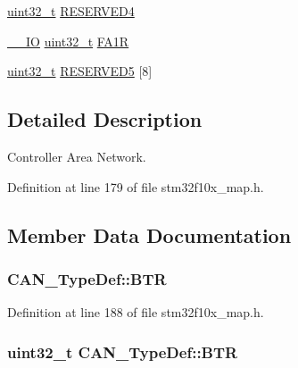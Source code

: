 \begin{DoxyCompactItemize}
\item 
\hyperlink{_p_e___types_8h_a33594304e786b158f3fb30289278f5af}{uint32\+\_\+t} \hyperlink{struct_c_a_n___type_def_a51c408c7c352b8080f0c6d42bf811d43}{R\+E\+S\+E\+R\+V\+E\+D4}
\item 
\hyperlink{group___c_m_s_i_s___c_m3__core__definitions_gaec43007d9998a0a0e01faede4133d6be}{\+\_\+\+\_\+\+IO} \hyperlink{_p_e___types_8h_a33594304e786b158f3fb30289278f5af}{uint32\+\_\+t} \hyperlink{struct_c_a_n___type_def_ab57a3a6c337a8c6c7cb39d0cefc2459a}{F\+A1R}
\item 
\hyperlink{_p_e___types_8h_a33594304e786b158f3fb30289278f5af}{uint32\+\_\+t} \hyperlink{struct_c_a_n___type_def_ad4339975b6064cfe2aaeb642f916d6e0}{R\+E\+S\+E\+R\+V\+E\+D5} \mbox{[}8\mbox{]}
\end{DoxyCompactItemize}


\subsection{Detailed Description}
Controller Area Network. 

Definition at line 179 of file stm32f10x\+\_\+map.\+h.



\subsection{Member Data Documentation}
\subsubsection[{\texorpdfstring{B\+TR}{BTR}}]{ C\+A\+N\+\_\+\+Type\+Def\+::\+B\+TR}\hypertarget{struct_c_a_n___type_def_a62b2f51fd71dee6149a8cf739fd3d284}{}\label{struct_c_a_n___type_def_a62b2f51fd71dee6149a8cf739fd3d284}


Definition at line 188 of file stm32f10x\+\_\+map.\+h.

\subsubsection[{\texorpdfstring{B\+TR}{BTR}}]{ {\bf uint32\+\_\+t} C\+A\+N\+\_\+\+Type\+Def\+::\+B\+TR}\hypertarget{struct_c_a_n___type_def_accad1e4155459a13369f5ad0e7c6da29}{}\label{struct_c_a_n___type_def_accad1e4155459a13369f5ad0e7c6da29}



